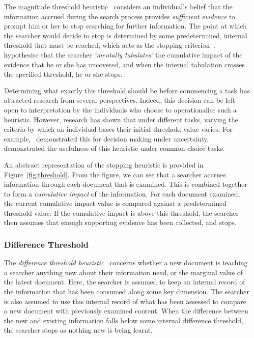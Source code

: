 The magnitude threshold heuristic~\citep{nickles1995judgment} considers an individual's belief that the information accrued during the search process provides \emph{sufficient evidence} to prompt him or her to stop searching for further information. The point at which the searcher would decide to stop is determined by some predetermined, internal threshold that must be reached, which acts as the stopping criterion~\citep{wald1948sequential_analysis, nickles1995judgment}.~\cite{gettys1979hypothesis} hypothesise that the searcher \emph{`mentally tabulates'} the cumulative impact of the evidence that he or she has uncovered, and when the internal tabulation crosses the specified threshold, he or she stops.

Determining what exactly this threshold should be before commencing a task has attracted research from several perspectives. Indeed, this decision can be left open to interpretation by the individuals who choose to operationalise such a heuristic. However, research has shown that under different tasks, varying the criteria by which an individual bases their initial threshold value varies. For example,~\cite{busemeyer1982choice_behaviour} demonstrated this for decision making under uncertainty.~\cite{saad1996stopping} demonstrated the usefulness of this heuristic under common choice tasks.

An abstract representation of the stopping heuristic is provided in Figure~\ref{fig:threshold}. From the figure, we can see that a searcher accrues information through each document that is examined. This is combined together to form a \emph{cumulative impact} of the information. For each document examined, the current cumulative impact value is compared against a predetermined threshold value. If the cumulative impact is above this threshold, the searcher then assumes that enough supporting evidence has been collected, and stops.

\subsubsection{Difference Threshold}\label{sec:stopping_background:heuristics:difference}
The \emph{difference threshold heuristic}~\citep{nickles1995judgment} concerns whether a new document is teaching a searcher anything new about their information need, or the marginal value of the latest document. Here, the searcher is assumed to keep an internal record of the information that has been consumed along some key dimension. The searcher is also assumed to use this internal record of what has been assessed to compare a new document with previously examined content. When the difference between the new and existing information falls below some internal difference threshold, the searcher stops as nothing new is being learnt.

